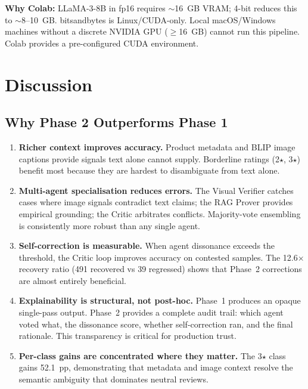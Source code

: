 \documentclass[12pt,a4paper]{article}
\begin{document}
\noindent \textbf{Why Colab:} LLaMA-3-8B in fp16 requires $\sim$16~GB VRAM; 4-bit reduces
this to $\sim$8--10~GB. bitsandbytes is Linux/CUDA-only. Local macOS/Windows machines
without a discrete NVIDIA GPU ($\geq$16~GB) cannot run this pipeline. Colab provides a
pre-configured CUDA environment.

\section{Discussion}

\subsection{Why Phase 2 Outperforms Phase 1}

\begin{enumerate}[leftmargin=*]
  \item \textbf{Richer context improves accuracy.} Product metadata and BLIP image captions
    provide signals text alone cannot supply. Borderline ratings (2$\star$, 3$\star$) benefit
    most because they are hardest to disambiguate from text alone.

  \item \textbf{Multi-agent specialisation reduces errors.} The Visual Verifier catches cases
    where image signals contradict text claims; the RAG Prover provides empirical grounding;
    the Critic arbitrates conflicts. Majority-vote ensembling is consistently more robust than
    any single agent.

  \item \textbf{Self-correction is measurable.} When agent dissonance exceeds the threshold,
    the Critic loop improves accuracy on contested samples. The 12.6$\times$ recovery ratio
    (491 recovered vs 39 regressed) shows that Phase~2 corrections are almost entirely
    beneficial.

  \item \textbf{Explainability is structural, not post-hoc.} Phase~1 produces an opaque
    single-pass output. Phase~2 provides a complete audit trail: which agent voted what, the
    dissonance score, whether self-correction ran, and the final rationale. This transparency
    is critical for production trust.

  \item \textbf{Per-class gains are concentrated where they matter.} The 3$\star$ class gains
    52.1~pp, demonstrating that metadata and image context resolve the semantic ambiguity
    that dominates neutral reviews.
\end{enumerate}
\end{document}
